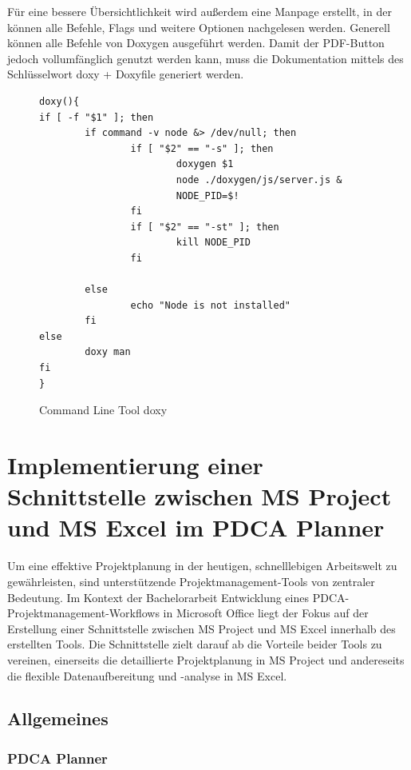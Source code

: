 \documentclass[11pt,a4paper]{report}
\begin{document}
\noindent
Für eine bessere Übersichtlichkeit wird außerdem eine Manpage erstellt, in der können alle Befehle, Flags und weitere Optionen nachgelesen werden. Generell können alle Befehle von Doxygen ausgeführt werden. Damit der PDF-Button jedoch vollumfänglich genutzt werden kann, muss die Dokumentation mittels des Schlüsselwort \glqq doxy + Doxyfile \grqq{} generiert werden.

\begin{figure}[H]
    \begin{verbatim}
doxy(){
if [ -f "$1" ]; then
        if command -v node &> /dev/null; then
                if [ "$2" == "-s" ]; then
                        doxygen $1
                        node ./doxygen/js/server.js &
                        NODE_PID=$!
                fi
                if [ "$2" == "-st" ]; then
                        kill NODE_PID
                fi

        else
                echo "Node is not installed"
        fi
else
        doxy man
fi
}
    \end{verbatim}
    \centering
    \caption{Command Line Tool \glqq doxy \grqq{}}
    \label{code:doxy_command_line}
\end{figure}


\chapter{
Implementierung einer Schnittstelle zwischen MS Project und MS Excel im PDCA Planner
} \label{chap:sling}
Um eine effektive Projektplanung in der heutigen, schnelllebigen Arbeitswelt zu gewährleisten, sind unterstützende Projektmanagement-Tools von zentraler Bedeutung. Im Kontext der Bachelorarbeit  \glqq Entwicklung eines PDCA-Projektmanagement-Workflows in Microsoft Office \grqq{} liegt der Fokus auf der Erstellung einer Schnittstelle zwischen MS Project und MS Excel innerhalb des erstellten Tools. Die Schnittstelle zielt darauf ab die Vorteile beider Tools zu vereinen, einerseits die detaillierte Projektplanung in MS Project und andereseits die flexible Datenaufbereitung und -analyse in MS Excel.


\section{Allgemeines}


\subsection{PDCA Planner}
\end{document}
